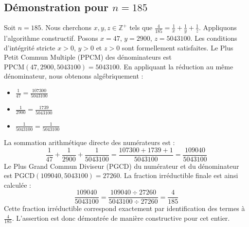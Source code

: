 \documentclass[11pt,a4paper]{article}
\begin{document}
\subsection{Démonstration pour $n = 185$}
Soit $n = 185$. Nous cherchons $x, y, z \in \mathbb{Z}^{+}$ tels que $\frac{4}{185} = \frac{1}{x} + \frac{1}{y} + \frac{1}{z}$.
Appliquons l'algorithme constructif. Posons $x = 47$, $y = 2900$, $z = 5043100$.
Les conditions d'intégrité stricte $x > 0$, $y > 0$ et $z > 0$ sont formellement satisfaites.
Le Plus Petit Commun Multiple (PPCM) des dénominateurs est $\text{PPCM}(47, 2900, 5043100) = 5043100$.
En appliquant la réduction au même dénominateur, nous obtenons algébriquement :
\begin{itemize}
    \item $\frac{1}{47} = \frac{107300}{5043100}$
    \item $\frac{1}{2900} = \frac{1739}{5043100}$
    \item $\frac{1}{5043100} = \frac{1}{5043100}$
\end{itemize}
La sommation arithmétique directe des numérateurs est :
$$ \frac{1}{47} + \frac{1}{2900} + \frac{1}{5043100} = \frac{107300 + 1739 + 1}{5043100} = \frac{109040}{5043100} $$
Le Plus Grand Commun Diviseur (PGCD) du numérateur et du dénominateur est $\text{PGCD}(109040, 5043100) = 27260$.
La fraction irréductible finale est ainsi calculée :
$$ \frac{109040}{5043100} = \frac{109040 \div 27260}{5043100 \div 27260} = \frac{4}{185} $$
Cette fraction irréductible correspond exactement par identification des termes à $\frac{4}{185}$. L'assertion est donc démontrée de manière constructive pour cet entier.
\end{document}
